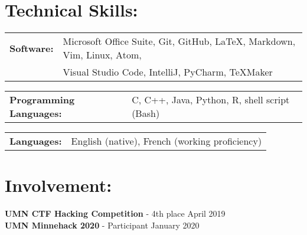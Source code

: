 \documentclass[10pt]{article}
\begin{document}
	\hrulefill	
	
	\section*{Technical Skills:}
		\begin{tabular}{@{}l@{\ }l}
		\textbf{Software: } & Microsoft Office Suite, Git, GitHub, {\large\LaTeX}, Markdown, Vim, Linux, Atom, \\  & Visual Studio Code, IntelliJ, PyCharm, TeXMaker\\
		\end{tabular}
		
		\vspace{5pt}
		\noindent
		\begin{tabular}{@{}l@{\ }l}
		\textbf{Programming Languages: } & C, C++, Java, Python, R, shell script (Bash) \\
		\end{tabular}
		
		\vspace{5pt}
		\noindent
		\begin{tabular}{@{}l@{\ }l}
		\textbf{Languages: } & English (native), French (working proficiency) \\
		\end{tabular}
		
		
	\hrulefill
	
	\section*{Involvement:}
		\textbf{UMN CTF Hacking Competition} - 4th place \hfill April 2019 \\
		\textbf{UMN Minnehack 2020 } - Participant \hfill January 2020\\
		
\end{document}
